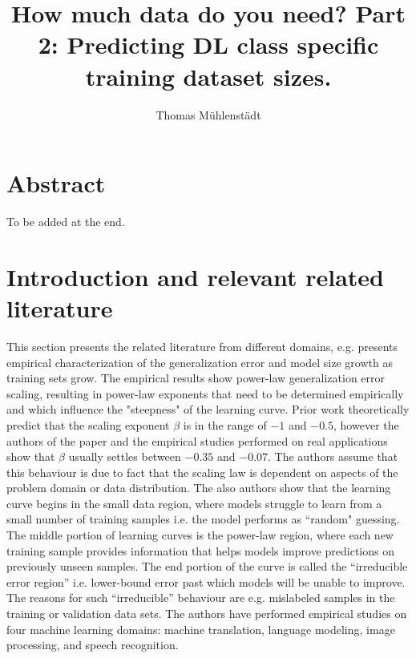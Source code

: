 \documentclass{article} %
\title{How much data do you need? Part 2: Predicting DL class specific training dataset sizes.}
\author{Thomas Mühlenstädt}
\begin{document}
\maketitle

\section*{Abstract}

To be added at the end.

\section{Introduction and relevant related literature}


This section presents the related literature from different domains, e.g. \cite{hestness2017deep} presents empirical characterization of the generalization error and model size growth as training sets grow.  The empirical results show power-law generalization error scaling, resulting in power-law exponents that need to be determined empirically and which influence the "steepness" of the learning curve. Prior work theoretically predict that the scaling exponent $\beta$ is in the range of $-1$ and $-0.5$, however the authors of the paper and the empirical studies performed on real applications show that $\beta$ usually settles between $-0.35$ and $-0.07$. The authors assume that this behaviour is due to fact that the scaling law is dependent on aspects of the problem domain or data distribution. The also authors show that the learning curve begins in the small data region, where models struggle to learn from a small number of training samples i.e. the model performs as “random" guessing. The middle portion of learning curves is the power-law region, where each new training sample provides information that helps models improve predictions on previously unseen samples. The end portion of the curve is called the “irreducible error region” i.e. lower-bound error past which models will be unable to improve. The reasons for such “irreducible” behaviour are e.g. mislabeled samples in the training or validation data sets. The authors have performed empirical studies on four machine learning domains: machine translation, language modeling, image processing, and speech recognition.
\end{document}
